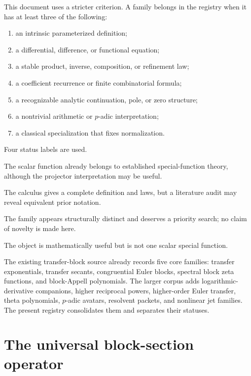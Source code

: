 \documentclass[11pt]{article}
\theoremstyle{definition}
\theoremstyle{remark}
\begin{document}
This document uses a stricter criterion.  A family belongs in the registry when it has at least three of the following:
\begin{enumerate}[label=(\roman*)]
\item an intrinsic parameterized definition;
\item a differential, difference, or functional equation;
\item a stable product, inverse, composition, or refinement law;
\item a coefficient recurrence or finite combinatorial formula;
\item a recognizable analytic continuation, pole, or zero structure;
\item a nontrivial arithmetic or $p$-adic interpretation;
\item a classical specialization that fixes normalization.
\end{enumerate}

Four status labels are used.
\begin{description}[style=nextline]
\item[Classical boundary.] The scalar function already belongs to established special-function theory, although the projector interpretation may be useful.
\item[Explicit derived family.] The calculus gives a complete definition and laws, but a literature audit may reveal equivalent prior notation.
\item[Candidate-new family.] The family appears structurally distinct and deserves a priority search; no claim of novelty is made here.
\item[Operator or construction schema.] The object is mathematically useful but is not one scalar special function.
\end{description}

The existing transfer-block source already records five core families: transfer exponentials, transfer secants, congruential Euler blocks, spectral block zeta functions, and block-Appell polynomials.  The larger corpus adds logarithmic-derivative companions, higher reciprocal powers, higher-order Euler transfer, theta polynomials, $p$-adic avatars, resolvent packets, and nonlinear jet families.  The present registry consolidates them and separates their statuses.

\section{The universal block-section operator}
\end{document}
